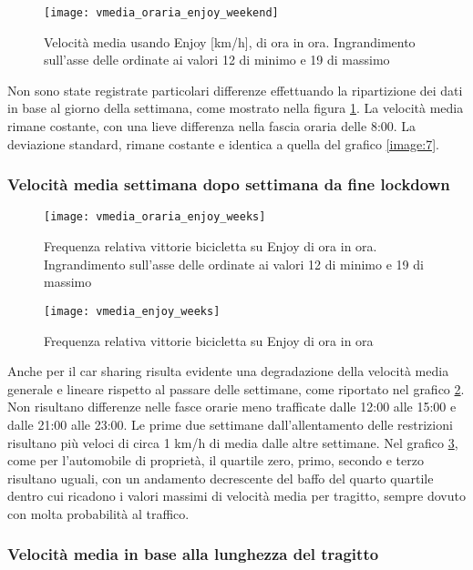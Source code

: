 \begin{figure}[H]
	\texttt{[image: vmedia\_oraria\_enjoy\_weekend]}
	\caption{Velocità media usando Enjoy [km/h], di ora in ora. Ingrandimento sull'asse delle ordinate ai valori 12 di minimo e 19 di massimo}
	\label{image:20}
\end{figure}

Non sono state registrate particolari differenze effettuando la ripartizione dei dati in base al giorno della settimana, come mostrato nella figura \ref{image:20}. La velocità media rimane costante, con una lieve differenza nella fascia oraria delle 8:00. La deviazione standard, rimane costante e identica a quella del grafico \ref{image:7}.

\subsubsection{Velocità media settimana dopo settimana da fine lockdown}

\begin{figure}[H]
	\texttt{[image: vmedia\_oraria\_enjoy\_weeks]}
	\caption{Frequenza relativa vittorie bicicletta su Enjoy di ora in ora. Ingrandimento sull'asse delle ordinate ai valori 12 di minimo e 19 di massimo}
	\label{image:16}
\end{figure}

\begin{figure}[H]
	\texttt{[image: vmedia\_enjoy\_weeks]}
	\caption{Frequenza relativa vittorie bicicletta su Enjoy di ora in ora}
	\label{image:28}
\end{figure}

Anche per il car sharing risulta evidente una degradazione della velocità media generale e lineare rispetto al passare delle settimane, come riportato nel grafico \ref{image:16}. Non risultano differenze nelle fasce orarie meno trafficate dalle 12:00 alle 15:00 e dalle 21:00 alle 23:00. Le prime due settimane dall'allentamento delle restrizioni risultano più veloci di circa 1 km/h di media dalle altre settimane. Nel grafico \ref{image:28}, come per l'automobile di proprietà, il quartile zero, primo, secondo e terzo risultano uguali, con un andamento decrescente del baffo del quarto quartile dentro cui ricadono i valori massimi di velocità media per tragitto, sempre dovuto con molta probabilità al traffico.

\subsubsection{Velocità media in base alla lunghezza del tragitto}

